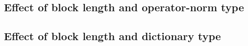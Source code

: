 \subsection{Effect of block length and operator-norm type} %

\subsection{Effect of block length and dictionary type} %

